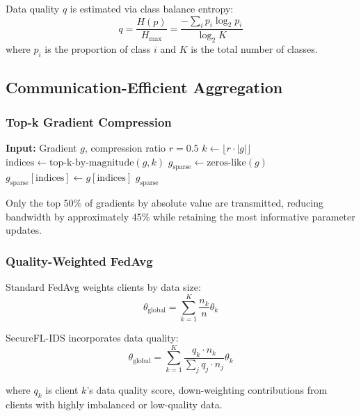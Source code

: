 Data quality $q$ is estimated via class balance entropy:
\begin{equation}
q = \frac{H(p)}{H_{\text{max}}} = \frac{-\sum_i p_i \log_2 p_i}{\log_2 K}
\end{equation}
where $p_i$ is the proportion of class $i$ and $K$ is the total number of classes.

\subsection{Communication-Efficient Aggregation}

\subsubsection{Top-k Gradient Compression}

\begin{algorithm}
\caption{Top-k Sparsification}
\begin{algorithmic}
\STATE \textbf{Input:} Gradient $g$, compression ratio $r=0.5$
\STATE $k \leftarrow \lfloor r \cdot |g| \rfloor$
\STATE $\text{indices} \leftarrow \text{top-k-by-magnitude}(g, k)$
\STATE $g_{\text{sparse}} \leftarrow \text{zeros-like}(g)$
\STATE $g_{\text{sparse}}[\text{indices}] \leftarrow g[\text{indices}]$
\RETURN $g_{\text{sparse}}$
\end{algorithmic}
\end{algorithm}

Only the top 50\% of gradients by absolute value are transmitted, reducing bandwidth by approximately 45\% while retaining the most informative parameter updates.

\subsubsection{Quality-Weighted FedAvg}

Standard FedAvg weights clients by data size:
\begin{equation}
\theta_{\text{global}} = \sum_{k=1}^{K} \frac{n_k}{n} \theta_k
\end{equation}

SecureFL-IDS incorporates data quality:
\begin{equation}
\theta_{\text{global}} = \sum_{k=1}^{K} \frac{q_k \cdot n_k}{\sum_j q_j \cdot n_j} \theta_k
\end{equation}

where $q_k$ is client $k$'s data quality score, down-weighting contributions from clients with highly imbalanced or low-quality data.

